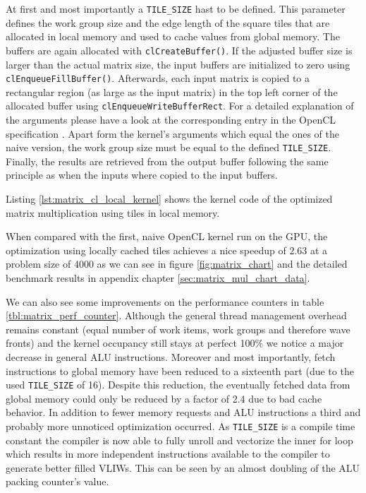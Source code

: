 At first and most importantly a \lstinline!TILE_SIZE! hast to be defined. This parameter defines the work group size and the edge length of the square tiles that are allocated in local memory and used to cache values from global memory.
The buffers are again allocated with \lstinline!clCreateBuffer()!. If the adjusted buffer size is larger than the actual matrix size, the input buffers are initialized to zero using \lstinline!clEnqueueFillBuffer()!. Afterwards, each input matrix is copied to a rectangular region (as large as the input matrix) in the top left corner of the allocated buffer using \lstinline!clEnqueueWriteBufferRect!. For a detailed explanation of the arguments please have a look at the corresponding entry in the OpenCL specification \cite[p.76]{opencl_spec}. Apart form the kernel's arguments which equal the ones of the naive version, the work group size must be equal to the defined \lstinline!TILE_SIZE!. Finally, the results are retrieved from the output buffer following the same principle as when the inputs where copied to the input buffers.

Listing \ref{lst:matrix_cl_local_kernel} shows the kernel code of the optimized matrix multiplication using tiles in local memory.



When compared with the first, naive OpenCL kernel run on the GPU, the optimization using locally cached tiles achieves a nice speedup of 2.63 at a problem size of 4000 as we can see in figure \ref{fig:matrix_chart} and the detailed benchmark results in appendix chapter \ref{sec:matrix_mul_chart_data}.

We can also see some improvements on the performance counters in table \ref{tbl:matrix_perf_counter}. Although the general thread management overhead remains constant (equal number of work items, work groups and therefore wave fronts) and the kernel occupancy still stays at perfect 100\% we notice a major decrease in general ALU instructions. Moreover and most importantly, fetch instructions to global memory have been reduced to a sixteenth part (due to the used \lstinline!TILE_SIZE! of 16). Despite this reduction, the eventually fetched data from global memory could only be reduced by a factor of 2.4 due to bad cache behavior.
In addition to fewer memory requests and ALU instructions a third and probably more unnoticed optimization occurred. As \lstinline!TILE_SIZE! is a compile time constant the compiler is now able to fully unroll and vectorize the inner for loop which results in more independent instructions available to the compiler to generate better filled VLIWs. This can be seen by an almost doubling of the ALU packing counter's value.


